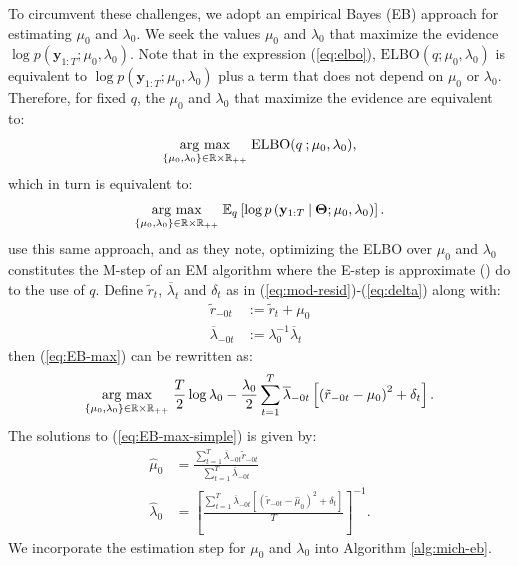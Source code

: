 To circumvent these challenges, we adopt an empirical Bayes (EB) approach for estimating $\mu_0$ and $\lambda_0$. We seek the values $\mu_0$ and $\lambda_0$ that maximize the evidence $\log p(\mathbf{y}_{1:T};\mu_0,\lambda_0)$. Note that in the expression (\ref{eq:elbo}), $\text{ELBO}(q;\mu_0,\lambda_0)$ is equivalent to $\log p(\mathbf{y}_{1:T};\mu_0,\lambda_0)$ plus a term that does not depend on $\mu_0$ or $\lambda_0$. Therefore, for fixed $q$, the $\mu_0$ and $\lambda_0$ that maximize the evidence are equivalent to: 
\begin{align}
    \underset{\{\mu_0,\lambda_0\}\in\mathbb{R}\times\mathbb{R}_{++}}{\text{\normalfont arg max}} \; \text{ELBO}(q\:;\mu_0,\lambda_0),
\end{align}
which in turn is equivalent to:
\begin{align}\label{eq:EB-max}
    \underset{\{\mu_0,\lambda_0\}\in\mathbb{R}\times\mathbb{R}_{++}}{\text{\normalfont arg max}} \; \mathbb{E}_{q} \left[\log p\left(\mathbf{y}_{1:T} \:|\: \boldsymbol{\Theta};\mu_0,\lambda_0\right)\right]. 
\end{align}
\cite{Wang20} use this same approach, and as they note, optimizing the ELBO over $\mu_0$ and $\lambda_0$ constitutes the M-step of an EM algorithm where the E-step is approximate (\citealp{Dempster77, Heskes03, Neal98}) do to the use of $q$. Define $\tilde{r}_t$, $\overline{\lambda}_t$ and $\delta_t$ as in (\ref{eq:mod-resid})-(\ref{eq:delta}) along with: 
\begin{align}
    \tilde{r}_{-0t} &:= \tilde{r}_t + \mu_0 \\
    \overline{\lambda}_{-0t} &:= \lambda_0^{-1}\overline{\lambda}_t
\end{align}
then (\ref{eq:EB-max}) can be rewritten as:
\begin{align}\label{eq:EB-max-simple}
    \underset{\{\mu_0,\lambda_0\}\in\mathbb{R}\times\mathbb{R}_{++}}{\text{\normalfont arg max}} \; \frac{T }{2}\log\lambda_0 - \frac{\lambda_0}{2}\sum_{t=1}^{T} \overline{\lambda}_{-0t}\left[\left(\tilde{r}_{-0t}-\mu_0\right)^2 + \delta_t\right].
\end{align}
The solutions to (\ref{eq:EB-max-simple}) is given by:
\begin{align}
    \hat{\mu}_0 &= \frac{\sum_{t=1}^{T} \overline{\lambda}_{-0t}\tilde{r}_{-0t}}{\sum_{t=1}^{T} \overline{\lambda}_{-0t}} \label{eq:EB-max-solution-mu} \\
    \hat{\lambda}_0 &= \left[\frac{\sum_{t=1}^{T} \overline{\lambda}_{-0t}[\left(\tilde{r}_{-0t}-\hat{\mu}_0\right)^2 + \delta_t]}{T}\right]^{-1}. \label{eq:EB-max-solution-lambda}
\end{align}
We incorporate the estimation step for $\mu_0$ and $\lambda_0$ into Algorithm \ref{alg:mich-eb}.


